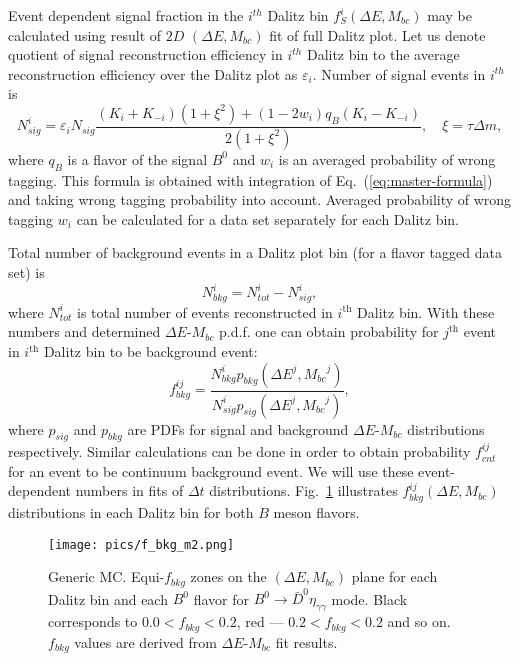 \documentclass[preprint,aps,showpacs]{revtex4}
\newcommand{\dt}{\ensuremath{\Delta t}\xspace}
\newcommand{\bdetagg}{\ensuremath{B^0\to \bar D^0\eta_{\gamma\gamma}}\xspace}
\newcommand{\de}{\ensuremath{\Delta E}\xspace}
\newcommand{\mbc}{\ensuremath{M_{bc}}\xspace}
\begin{document}
 Event dependent signal fraction in the $i^{th}$ Dalitz bin $f^{i}_S(\de,\mbc)$ may be calculated using result of $2D$ $(\de,\mbc)$ fit of full Dalitz plot. Let us denote quotient of signal reconstruction efficiency in $i^{th}$ Dalitz bin to the average reconstruction efficiency over the Dalitz plot as $\varepsilon_i$. Number of signal events in $i^{th}$ is
\begin{equation}\label{eq:nsig-prediction-with-tag}
  N_{sig}^i = \varepsilon_i N_{sig}\frac{(K_i + K_{-i})(1+\xi^2)+(1-2w_i)q_B(K_i - K_{-i})}{2(1+\xi^2)},\quad \xi = \tau\Delta m,
\end{equation}
where $q_B$ is a flavor of the signal $B^0$ and $w_i$ is an averaged probability of wrong tagging. This formula is obtained with integration of Eq.~(\ref{eq:master-formula}) and taking wrong tagging probability into account. Averaged probability of wrong tagging $w_i$ can be calculated for a data set separately for each Dalitz bin.

Total number of background events in a Dalitz plot bin (for a flavor tagged data set) is
\begin{equation}
 N_{bkg}^i = N_{tot}^i - N_{sig}^i,
\end{equation}
where $N_{tot}^i$ is total number of events reconstructed in $i^{\text{th}}$ Dalitz bin. With these numbers and determined \de-\mbc p.d.f. one can obtain probability for $j^{\text{th}}$ event in $i^{\text{th}}$ Dalitz bin to be background event:
\begin{equation}\label{eq:f_bkg}
 f^{ij}_{bkg} = \frac{N_{bkg}^ip_{bkg}(\de^j,\mbc^j)}{N_{sig}^ip_{sig}(\de^j,\mbc^j)},
\end{equation}
where $p_{sig}$ and $p_{bkg}$ are PDFs for signal and background \de-\mbc distributions respectively. Similar calculations can be done in order to obtain probability $f^{ij}_{cnt}$ for an event to be continuum background event. We will use these event-dependent numbers in fits of \dt distributions. Fig.~\ref{fig:f_bkg} illustrates $f^{ij}_{bkg}(\de,\mbc)$ distributions in each Dalitz bin for both $B$ meson flavors.

\begin{figure}[htb]
\texttt{[image: pics/f\_bkg\_m2.png]}
\caption{Generic MC. Equi-$f_{bkg}$ zones on the $(\de,\mbc)$ plane for each Dalitz bin and each $B^0$ flavor for \bdetagg mode. Black corresponds to $0.0<f_{bkg}<0.2$, red --- $0.2<f_{bkg}<0.2$ and so on. $f_{bkg}$ values are derived from \de-\mbc fit results.}
 \label{fig:f_bkg}
\end{figure}
\end{document}
